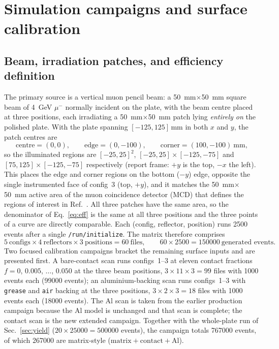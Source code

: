 \documentclass[11pt,a4paper]{article}
\begin{document}
\section{Simulation campaigns and surface calibration}
\label{sec:sim}

\subsection{Beam, irradiation patches, and efficiency definition}

The primary source is a vertical muon pencil beam: a \SI{50}{\milli\meter}$\times$\SI{50}{\milli\meter}
square beam of \SI{4}{\giga\electronvolt} $\mu^-$ normally incident on the plate,
with the beam centre placed at three positions, each irradiating a
\SI{50}{\milli\meter}$\times$\SI{50}{\milli\meter} patch lying \emph{entirely
on} the polished plate. With the plate spanning $[-125,125]\,\si{\milli\meter}$
in both $x$ and $y$, the patch centres are
\[
  \text{centre} = (0,0),\qquad
  \text{edge} = (0,-100),\qquad
  \text{corner} = (100,-100)\ \si{\milli\meter},
\]
so the illuminated regions are $[-25,25]^2$, $[-25,25]\times[-125,-75]$ and
$[75,125]\times[-125,-75]$ respectively (report frame: $+y$ is the top,
$-x$ the left). This places the edge and corner regions on the bottom
($-y$) edge, opposite the single instrumented face of config~3 (top, $+y$),
and it matches the \SI{50}{\milli\meter}$\times$\SI{50}{\milli\meter}
active area of the muon coincidence detector (MCD) that defines the regions of
interest in Ref.~\cite{Rao2025}. All three patches have the same area, so the
denominator of Eq.~\ref{eq:eff} is the same at all three positions and the
three points of a curve are directly comparable. Each
(config, reflector, position) runs \num{2500} events after a single
\texttt{/run/initialize}. The matrix therefore comprises
\[
  5\ \text{configs} \times 4\ \text{reflectors} \times 3\ \text{positions}
  = 60\ \text{files}, \qquad 60 \times \num{2500} = \num{150000}\ \text{generated events}.
\]
Two focused calibration campaigns bracket the remaining surface inputs and are
presented first. A bare-contact scan
runs configs~1--3 at eleven contact fractions
$f=0$, $0.005$, $\dots$, $0.050$ at the three beam positions,
$3 \times 11 \times 3 = \num{99}$ files with \num{1000} events each
(\num{99000} events); an aluminium-backing scan runs configs~1--3 with
\texttt{grease} and \texttt{air} backing at the three positions,
$3 \times 2 \times 3 = \num{18}$ files with \num{1000} events each
(\num{18000} events). The Al scan is taken from the earlier production
campaign because the Al model is unchanged and that scan is complete; the
contact scan is the new extended campaign. Together with the whole-plate run of
Sec.~\ref{sec:yield} ($20 \times \num{25000} = \num{500000}$ events), the
campaign totals \num{767000} events, of which \num{267000} are matrix-style
($\text{matrix} + \text{contact} + \text{Al}$).
\end{document}
